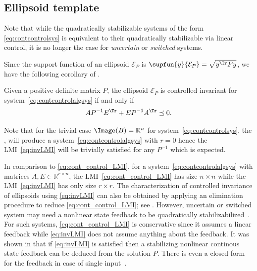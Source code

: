 \documentclass[11pt,twoside,a4paper,openright]{uclouvain-thesis}
\begin{document}
\subsection{Ellipsoid template}
Note that while the quadratically stabilizable systems of the form \eqref{eq:contcontrolsys}
is equivalent to their quadratically stabilizable via linear control, it is no longer
the case for \emph{uncertain} or \emph{switched} systems.


Since the support function of an ellipsoid $\mathcal{E}_P$ is $\supfun{y}{\mathcal{E}_P} = \sqrt{y^\Tr P y}$,
we have the following corollary of .
\begin{mycoro}
  Given a positive definite matrix $P$, the ellipsoid $\mathcal{E}_P$ is
  controlled invariant for system~\eqref{eq:contcontrolalgsys} if and only if
  \begin{equation}
    \label{eq:invLMI}
    AP^{-1}E^\Tr + EP^{-1}A^\Tr \preceq 0.
  \end{equation}
\end{mycoro}

Note that for the trivial case $\Image(B) = \mathbb{R}^n$ for system~\eqref{eq:contcontrolsys},
the , will produce a system~\eqref{eq:contcontrolalgsys} with $r = 0$ hence the
LMI~\eqref{eq:invLMI} will be trivially satisfied for any $P^{-1}$ which is expected.

In comparison to \eqref{eq:cont_control_LMI}, for a system~\eqref{eq:contcontrolalgsys} with matrices
$A, E \in \mathbb{R}^{r \times n}$, the LMI~\eqref{eq:cont_control_LMI} has
size $n \times n$ while the LMI~\eqref{eq:invLMI} has only size $r \times r$.
The characterization of controlled invariance of ellipsoids using \eqref{eq:invLMI}
can also be obtained by applying an elimination procedure to reduce \eqref{eq:cont_control_LMI};
see \cite[Equation~(7.11)]{boyd1994linear}.
However, uncertain or switched system may need a nonlinear state feedback to be quadratically
stabilizabilized~\cite{petersen1985quadratic}.
For such systems, \eqref{eq:cont_control_LMI} is conservative since it assumes a linear feedback
while \eqref{eq:invLMI} does not assume anything about the feedback.
It was shown in \cite{barmish1985necessary} that if \eqref{eq:invLMI} is satisfied then a stabilizing nonlinear continous
state feedback can be deduced from the solution $P$.
There is even a closed form for the feedback in case of single input~\cite[Eq.~(15)]{barmish1985necessary}.
\end{document}
